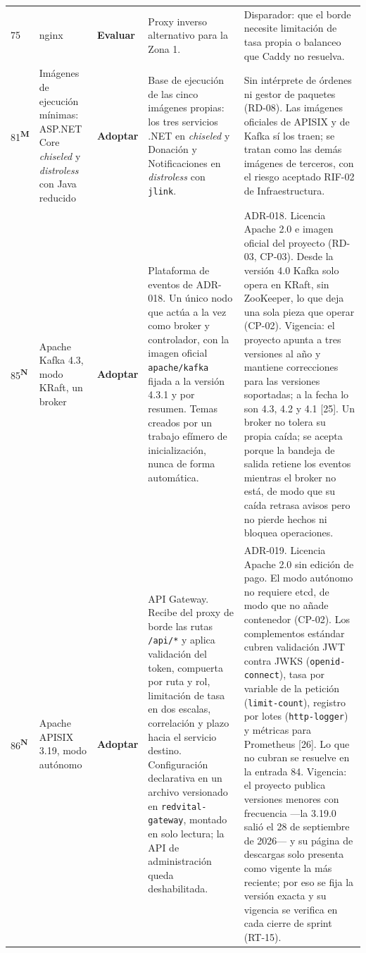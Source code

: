 \documentclass[11pt,a4paper]{article}
\newcommand{\adoptar}{\textcolor{ringAdoptar}{\textbf{Adoptar}}}
\newcommand{\evaluar}{\textcolor{ringEvaluar}{\textbf{Evaluar}}}
\newcommand{\nueva}{\textsuperscript{\textcolor{vinotinto}{\scriptsize\bfseries N}}}
\newcommand{\modif}{\textsuperscript{\textcolor{ringProbar}{\scriptsize\bfseries M}}}
\begin{document}
\begin{longtable}{L{0.8cm} L{2.6cm} L{1.6cm} L{4.1cm} L{4.5cm}}
75 & nginx & \evaluar{} & Proxy inverso alternativo para la Zona 1. & Disparador: que el borde necesite limitación de tasa propia o balanceo que Caddy no resuelva. \\

81\modif & Imágenes de ejecución mínimas: ASP.NET Core \emph{chiseled} y \emph{distroless} con Java reducido & \adoptar{} & Base de ejecución de las cinco imágenes propias: los tres servicios .NET en \emph{chiseled} y Donación y Notificaciones en \emph{distroless} con \texttt{jlink}. & Sin intérprete de órdenes ni gestor de paquetes (RD-08). Las imágenes oficiales de APISIX y de Kafka sí los traen; se tratan como las demás imágenes de terceros, con el riesgo aceptado RIF-02 de Infraestructura. \\

85\nueva & Apache Kafka 4.3, modo KRaft, un broker & \adoptar{} & Plataforma de eventos de ADR-018. Un único nodo que actúa a la vez como broker y controlador, con la imagen oficial \texttt{apache/kafka} fijada a la versión 4.3.1 y por resumen. Temas creados por un trabajo efímero de inicialización, nunca de forma automática. & ADR-018. Licencia Apache 2.0 e imagen oficial del proyecto (RD-03, CP-03). Desde la versión 4.0 Kafka solo opera en KRaft, sin ZooKeeper, lo que deja una sola pieza que operar (CP-02). Vigencia: el proyecto apunta a tres versiones al año y mantiene correcciones para las versiones soportadas; a la fecha lo son 4.3, 4.2 y 4.1 {[}25{]}. Un broker no tolera su propia caída; se acepta porque la bandeja de salida retiene los eventos mientras el broker no está, de modo que su caída retrasa avisos pero no pierde hechos ni bloquea operaciones. \\

86\nueva & Apache APISIX 3.19, modo autónomo & \adoptar{} & API Gateway. Recibe del proxy de borde las rutas \texttt{/api/*} y aplica validación del token, compuerta por ruta y rol, limitación de tasa en dos escalas, correlación y plazo hacia el servicio destino. Configuración declarativa en un archivo versionado en \texttt{redvital-gateway}, montado en solo lectura; la API de administración queda deshabilitada. & ADR-019. Licencia Apache 2.0 sin edición de pago. El modo autónomo no requiere etcd, de modo que no añade contenedor (CP-02). Los complementos estándar cubren validación JWT contra JWKS (\texttt{openid-connect}), tasa por variable de la petición (\texttt{limit-count}), registro por lotes (\texttt{http-logger}) y métricas para Prometheus {[}26{]}. Lo que no cubran se resuelve en la entrada 84. Vigencia: el proyecto publica versiones menores con frecuencia ---la 3.19.0 salió el 28 de septiembre de 2026--- y su página de descargas solo presenta como vigente la más reciente; por eso se fija la versión exacta y su vigencia se verifica en cada cierre de sprint (RT-15). \\


\end{longtable}
\end{document}
